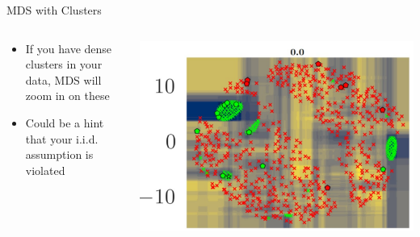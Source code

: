 \documentclass[aspectratio=169]{../latex_main/tntbeamer}  %
\begin{document}
	\begin{frame}[c]{MDS with Clusters}
        
        \begin{columns}
        
        \begin{column}{0.5\textwidth}
        
        \begin{itemize}
            \item If you have dense clusters in your data, MDS will zoom in on these
            \item Could be a hint that your i.i.d. assumption is violated
        \end{itemize}
        
        \end{column}
        
        \begin{column}{0.5\textwidth}
        
        \begin{center}
            \includegraphics[width=1\textwidth]{mds2.jpg}
        \end{center}
        
        \end{column}
        
        \end{columns}
        
	\end{frame}
	
\end{document}
